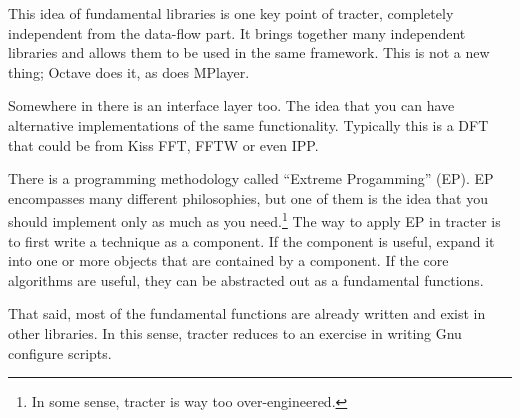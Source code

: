 This idea of fundamental libraries is one key point of tracter,
completely independent from the data-flow part.  It brings together
many independent libraries and allows them to be used in the same
framework.  This is not a new thing; Octave does it, as does MPlayer.

Somewhere in there is an interface layer too.  The idea that you can
have alternative implementations of the same functionality.  Typically
this is a DFT that could be from Kiss FFT, FFTW or even IPP.

There is a programming methodology called ``Extreme Progamming'' (EP).
EP encompasses many different philosophies, but one of them is the
idea that you should implement only as much as you need.\footnote{In
  some sense, tracter is way too over-engineered.}  The way to apply
EP in tracter is to first write a technique as a component.  If the
component is useful, expand it into one or more objects that are
contained by a component.  If the core algorithms are useful, they can
be abstracted out as a fundamental functions.

That said, most of the fundamental functions are already written and
exist in other libraries.  In this sense, tracter reduces to an
exercise in writing Gnu configure scripts.


